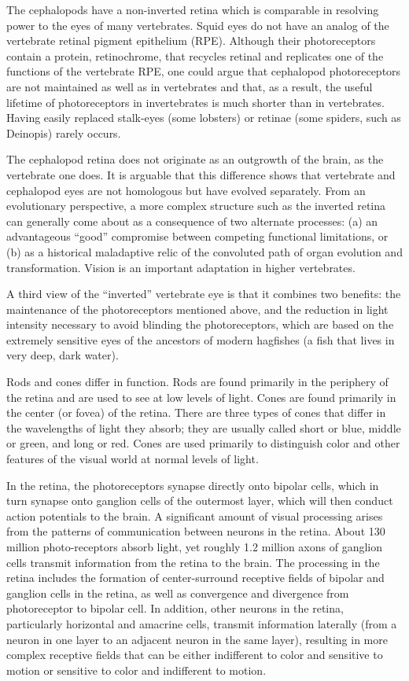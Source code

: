 The cephalopods have a non-inverted retina which is comparable in resolving power to the eyes of many vertebrates. Squid eyes do not have an analog of the vertebrate retinal pigment epithelium (RPE). Although their photoreceptors contain a protein, retinochrome, that recycles retinal and replicates one of the functions of the vertebrate RPE, one could argue that cephalopod photoreceptors are not maintained as well as in vertebrates and that, as a result, the useful lifetime of photoreceptors in invertebrates is much shorter than in vertebrates. Having easily replaced stalk-eyes (some lobsters) or retinae (some spiders, such as Deinopis) rarely occurs.

The cephalopod retina does not originate as an outgrowth of the brain, as the vertebrate one does. It is arguable that this difference shows that vertebrate and cephalopod eyes are not homologous but have evolved separately. From an evolutionary perspective, a more complex structure such as the inverted retina can generally come about as a consequence of two alternate processes: (a) an advantageous ``good'' compromise between competing functional limitations, or (b) as a historical maladaptive relic of the convoluted path of organ evolution and transformation. Vision is an important adaptation in higher vertebrates.

A third view of the ``inverted'' vertebrate eye is that it combines two benefits: the maintenance of the photoreceptors mentioned above, and the reduction in light intensity necessary to avoid blinding the photoreceptors, which are based on the extremely sensitive eyes of the ancestors of modern hagfishes (a fish that lives in very deep, dark water).

Rods and cones differ in function. Rods are found primarily in the periphery of the retina and are used to see at low levels of light. Cones are found primarily in the center (or fovea) of the retina. There are three types of cones that differ in the wavelengths of light they absorb; they are usually called short or blue, middle or green, and long or red. Cones are used primarily to distinguish color and other features of the visual world at normal levels of light.

In the retina, the photoreceptors synapse directly onto bipolar cells, which in turn synapse onto ganglion cells of the outermost layer, which will then conduct action potentials to the brain. A significant amount of visual processing arises from the patterns of communication between neurons in the retina. About 130 million photo-receptors absorb light, yet roughly 1.2 million axons of ganglion cells transmit information from the retina to the brain. The processing in the retina includes the formation of center-surround receptive fields of bipolar and ganglion cells in the retina, as well as convergence and divergence from photoreceptor to bipolar cell. In addition, other neurons in the retina, particularly horizontal and amacrine cells, transmit information laterally (from a neuron in one layer to an adjacent neuron in the same layer), resulting in more complex receptive fields that can be either indifferent to color and sensitive to motion or sensitive to color and indifferent to motion.

